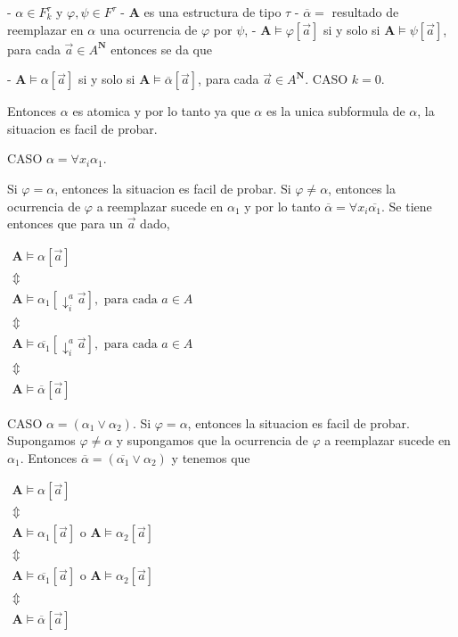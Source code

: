 - \(\alpha \in F_{k}^{\tau }\) y \(\varphi ,\psi \in F^{\tau }\)
- \(\mathbf{A}\) es una estructura de tipo \(\tau \)
- \(\overline{\alpha }=\) resultado de reemplazar en \(\alpha \) una ocurrencia de \(\varphi \) por \(\psi \),
- \(\mathbf{A}\models \varphi \left[ \vec{a}\right] \) si y solo si \( \mathbf{A}\models \psi \left[ \vec{a}\right] \), para cada \(\vec{a}\in A^{ \mathbf{N}}\)
entonces se da que

- \(\mathbf{A}\models \alpha \left[ \vec{a}\right] \) si y solo si \( \mathbf{A}\models \overline{\alpha }\left[ \vec{a}\right] \), para cada \(\vec{ a}\in A^{\mathbf{N}}\).
CASO \(k=0.\)

Entonces \(\alpha \) es atomica y por lo tanto ya que \(\alpha \) es la unica subformula de \(\alpha \), la situacion es facil de probar.

CASO \(\alpha =\forall x_{i}\alpha _{1}.\)

Si \(\varphi =\alpha \), entonces la situacion es facil de probar. Si \(\varphi \neq \alpha \), entonces la ocurrencia de \(\varphi \) a reemplazar sucede en \(\alpha _{1}\) y por lo tanto \(\overline{\alpha }=\forall x_{i} \overline{\alpha _{1}}.\) Se tiene entonces que para un \(\vec{a}\) dado,

\(\displaystyle \begin{array}{c} \mathbf{A}\models \alpha \left[ \vec{a}\right] \\ \Updownarrow \\ \mathbf{A}\models \alpha _{1}\left[ \downarrow _{i}^{a}\vec{a}\right] ,\text{ para cada }a\in A \\ \Updownarrow \\ \mathbf{A}\models \overline{\alpha _{1}}\left[ \downarrow _{i}^{a}\vec{a} \right] ,\text{ para cada }a\in A \\ \Updownarrow \\ \mathbf{A}\models \overline{\alpha }\left[ \vec{a}\right] \end{array} \)

CASO \(\alpha =(\alpha _{1}\vee \alpha _{2})\).
Si \(\varphi =\alpha \), entonces la situacion es facil de probar. Supongamos \(\varphi \neq \alpha \) y supongamos que la ocurrencia de \(\varphi \) a reemplazar sucede en \(\alpha _{1}\). Entonces \(\overline{\alpha }=( \overline{\alpha _{1}}\vee \alpha _{2})\) y tenemos que

\(\displaystyle \begin{array}{c} \mathbf{A}\models \alpha \left[ \vec{a}\right] \\ \Updownarrow \\ \mathbf{A}\models \alpha _{1}\left[ \vec{a}\right] \text{ o }\mathbf{A} \models \alpha _{2}\left[ \vec{a}\right] \\ \Updownarrow \\ \mathbf{A}\models \overline{\alpha _{1}}\left[ \vec{a}\right] \text{ o } \mathbf{A}\models \alpha _{2}\left[ \vec{a}\right] \\ \Updownarrow \\ \mathbf{A}\models \overline{\alpha }\left[ \vec{a}\right] \end{array} \)

